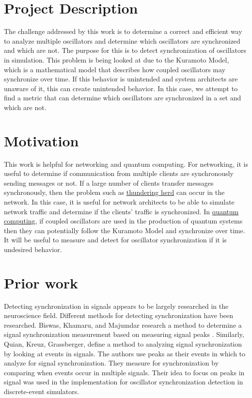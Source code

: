\documentclass{article}
\begin{document}
\section{Project Description} %

The challenge addressed by this work is to determine a correct and efficient way to analyze multiple oscillators and determine which oscillators are synchronized and which are not. The purpose for this is to detect synchronization of oscillators in simulation. This problem is being looked at due to the Kuramoto Model, which is a mathematical model that describes how coupled oscillators may synchronize over time. If this behavior is unintended and system architects are unaware of it, this can create unintended behavior. In this case, we attempt to find a metric that can determine which oscillators are synchronized in a set and which are not.

\section{Motivation} %
This work is helpful for networking and quantum computing. For networking, it is useful to determine if communication from multiple clients are synchronously sending messages or not. If a large number of clients transfer messages synchronously, then the problem such as \href{https://en.wikipedia.org/wiki/Thundering_herd_problem}{thundering herd} can occur in the network. In this case, it is useful for network architects to be able to simulate network traffic and determine if the clients' traffic is synchronized. In \href{https://en.wikipedia.org/wiki/Quantum_computing}{quantum computing}, if coupled oscillators are used in the production of quantum systems then they can potentially follow the Kuramoto Model and synchronize over time. It will be useful to measure and detect for oscillator synchronization if it is undesired behavior.

\section{Prior work} %
Detecting synchronization in signals appears to be largely researched in the neuroscience field. Different methods for detecting synchronization have been researched. Biswas, Khamaru, and Majumdar research a method to determine a signal synchronization measurement based on measuring signal peaks \cite{biswas_2014}. Similarly, Quian, Kreuz, Grassberger, define a method to analyzing signal synchronization by looking at events in signals\cite{quian_2002}. The authors use peaks as their events in which to analyze for signal synchronization. They measure for synchronization by comparing when events occur in multiple signals. Their idea to focus on peaks in signal was used in the implementation for oscillator synchronization detection in discrete-event simulators.
\end{document}
